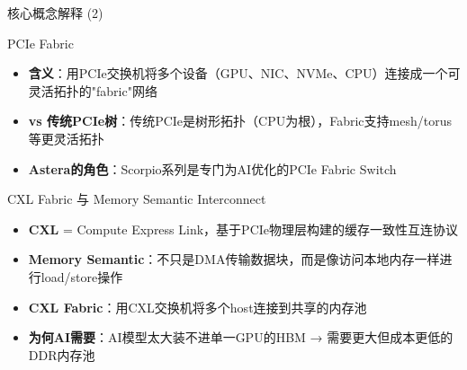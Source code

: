 \documentclass[UTF8,11pt,aspectratio=169]{beamer}
\begin{document}
\begin{frame}{核心概念解释 (2)}
    \begin{block}{PCIe Fabric}
        \begin{itemize}
            \item \textbf{含义}：用PCIe交换机将多个设备（GPU、NIC、NVMe、CPU）连接成一个可灵活拓扑的"fabric"网络
            \item \textbf{vs 传统PCIe树}：传统PCIe是树形拓扑（CPU为根），Fabric支持mesh/torus等更灵活拓扑
            \item \textbf{Astera的角色}：Scorpio系列是专门为AI优化的PCIe Fabric Switch
        \end{itemize}
    \end{block}

    \vspace{0.2cm}
    \begin{block}{CXL Fabric 与 Memory Semantic Interconnect}
        \begin{itemize}
            \item \textbf{CXL} = Compute Express Link，基于PCIe物理层构建的缓存一致性互连协议
            \item \textbf{Memory Semantic}：不只是DMA传输数据块，而是像访问本地内存一样进行load/store操作
            \item \textbf{CXL Fabric}：用CXL交换机将多个host连接到共享的内存池
            \item \textbf{为何AI需要}：AI模型太大装不进单一GPU的HBM → 需要更大但成本更低的DDR内存池
        \end{itemize}
    \end{block}
\end{frame}

\end{document}
